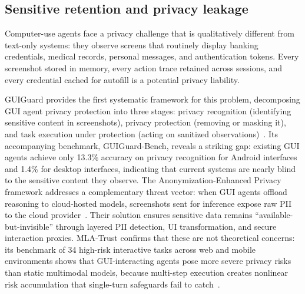 \subsection{Sensitive retention and privacy leakage}

Computer-use agents face a privacy challenge that is qualitatively different from text-only systems: they observe screens that routinely display banking credentials, medical records, personal messages, and authentication tokens. Every screenshot stored in memory, every action trace retained across sessions, and every credential cached for autofill is a potential privacy liability.

GUIGuard provides the first systematic framework for this problem, decomposing GUI agent privacy protection into three stages: privacy recognition (identifying sensitive content in screenshots), privacy protection (removing or masking it), and task execution under protection (acting on sanitized observations)~\cite{guiguard2026}. Its accompanying benchmark, GUIGuard-Bench, reveals a striking gap: existing GUI agents achieve only 13.3\% accuracy on privacy recognition for Android interfaces and 1.4\% for desktop interfaces, indicating that current systems are nearly blind to the sensitive content they observe. The Anonymization-Enhanced Privacy framework addresses a complementary threat vector: when GUI agents offload reasoning to cloud-hosted models, screenshots sent for inference expose raw PII to the cloud provider~\cite{anonprivacy2026}. Their solution ensures sensitive data remains ``available-but-invisible'' through layered PII detection, UI transformation, and secure interaction proxies. MLA-Trust confirms that these are not theoretical concerns: its benchmark of 34 high-risk interactive tasks across web and mobile environments shows that GUI-interacting agents pose more severe privacy risks than static multimodal models, because multi-step execution creates nonlinear risk accumulation that single-turn safeguards fail to catch~\cite{mlatrust2025}.

